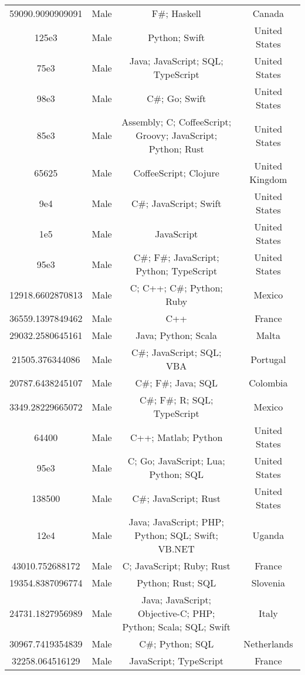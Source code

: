 \begin{center}
\begin{tabular}{ |c|c|c|c| }
59090.9090909091  &  Male  &  F\#; Haskell  &  Canada  \\ 
125e3  &  Male  &  Python; Swift  &  United States  \\ 
75e3  &  Male  &  Java; JavaScript; SQL; TypeScript  &  United States  \\ 
98e3  &  Male  &  C\#; Go; Swift  &  United States  \\ 
85e3  &  Male  &  Assembly; C; CoffeeScript; Groovy; JavaScript; Python; Rust  &  United States  \\ 
65625  &  Male  &  CoffeeScript; Clojure  &  United Kingdom  \\ 
9e4  &  Male  &  C\#; JavaScript; Swift  &  United States  \\ 
1e5  &  Male  &  JavaScript  &  United States  \\ 
95e3  &  Male  &  C\#; F\#; JavaScript; Python; TypeScript  &  United States  \\ 
12918.6602870813  &  Male  &  C; C++; C\#; Python; Ruby  &  Mexico  \\ 
36559.1397849462  &  Male  &  C++  &  France  \\ 
29032.2580645161  &  Male  &  Java; Python; Scala  &  Malta  \\ 
21505.376344086  &  Male  &  C\#; JavaScript; SQL; VBA  &  Portugal  \\ 
20787.6438245107  &  Male  &  C\#; F\#; Java; SQL  &  Colombia  \\ 
3349.28229665072  &  Male  &  C\#; F\#; R; SQL; TypeScript  &  Mexico  \\ 
64400  &  Male  &  C++; Matlab; Python  &  United States  \\ 
95e3  &  Male  &  C; Go; JavaScript; Lua; Python; SQL  &  United States  \\ 
138500  &  Male  &  C\#; JavaScript; Rust  &  United States  \\ 
12e4  &  Male  &  Java; JavaScript; PHP; Python; SQL; Swift; VB.NET  &  Uganda  \\ 
43010.752688172  &  Male  &  C; JavaScript; Ruby; Rust  &  France  \\ 
19354.8387096774  &  Male  &  Python; Rust; SQL  &  Slovenia  \\ 
24731.1827956989  &  Male  &  Java; JavaScript; Objective-C; PHP; Python; Scala; SQL; Swift  &  Italy  \\ 
30967.7419354839  &  Male  &  C\#; Python; SQL  &  Netherlands  \\ 
32258.064516129  &  Male  &  JavaScript; TypeScript  &  France  \\ 

\end{tabular}
\end{center}
